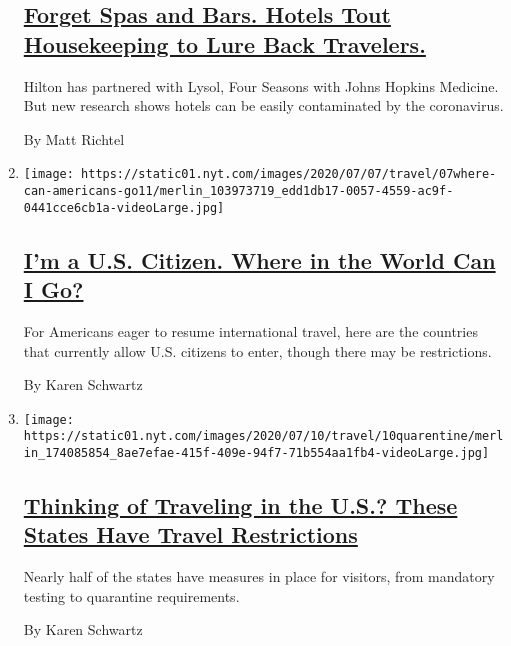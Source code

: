 \begin{enumerate}
{  \subsection{\texorpdfstring{\href{/2020/08/04/health/coronavirus-hotels-infect.html}{Forget
  Spas and Bars. Hotels Tout Housekeeping to Lure Back
  Travelers.}}{Forget Spas and Bars. Hotels Tout Housekeeping to Lure Back Travelers.}}\label{forget-spas-and-bars-hotels-tout-housekeeping-to-lure-back-travelers}}

  Hilton has partnered with Lysol, Four Seasons with Johns Hopkins
  Medicine. But new research shows hotels can be easily contaminated by
  the coronavirus.

  By Matt Richtel
\item
  \texttt{[image: https://static01.nyt.com/images/2020/07/07/travel/07where-can-americans-go11/merlin\_103973719\_edd1db17-0057-4559-ac9f-0441cce6cb1a-videoLarge.jpg]}

  \hypertarget{im-a-us-citizen-where-in-the-world-can-i-go}{%
  \subsection{\texorpdfstring{\href{/2020/07/07/travel/american-travelers-restrictions-coronavirus.html}{I'm
  a U.S. Citizen. Where in the World Can I
  Go?}}{I'm a U.S. Citizen. Where in the World Can I Go?}}\label{im-a-us-citizen-where-in-the-world-can-i-go}}

  For Americans eager to resume international travel, here are the
  countries that currently allow U.S. citizens to enter, though there
  may be restrictions.

  By Karen Schwartz
\item
  \texttt{[image: https://static01.nyt.com/images/2020/07/10/travel/10quarentine/merlin\_174085854\_8ae7efae-415f-409e-94f7-71b554aa1fb4-videoLarge.jpg]}

  \hypertarget{thinking-of-traveling-in-the-us-these-states-have-travel-restrictions}{%
  \subsection{\texorpdfstring{\href{/2020/07/10/travel/state-travel-restrictions.html}{Thinking
  of Traveling in the U.S.? These States Have Travel
  Restrictions}}{Thinking of Traveling in the U.S.? These States Have Travel Restrictions}}\label{thinking-of-traveling-in-the-us-these-states-have-travel-restrictions}}

  Nearly half of the states have measures in place for visitors, from
  mandatory testing to quarantine requirements.

  By Karen Schwartz
\end{enumerate}

